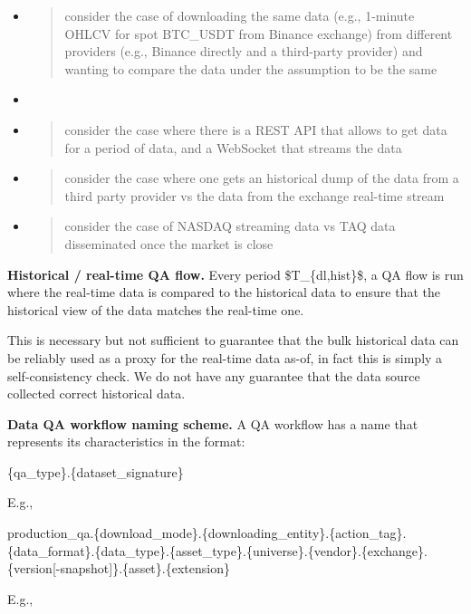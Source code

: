 \documentclass[11pt, reqno]{amsart}
\begin{document}
\begin{itemize}
\item
  \begin{quote}
  consider the case of downloading the same data (e.g., 1-minute OHLCV
  for spot BTC\_USDT from Binance exchange) from different providers
  (e.g., Binance directly and a third-party provider) and wanting to
  compare the data under the assumption to be the same
  \end{quote}
\item
\item
  \begin{quote}
  consider the case where there is a REST API that allows to get data
  for a period of data, and a WebSocket that streams the data
  \end{quote}
\item
  \begin{quote}
  consider the case where one gets an historical dump of the data from a
  third party provider vs the data from the exchange real-time stream
  \end{quote}
\item
  \begin{quote}
  consider the case of NASDAQ streaming data vs TAQ data disseminated
  once the market is close
  \end{quote}
\end{itemize}

\textbf{Historical / real-time QA flow.} Every period
\$T\_\{dl,hist\}\$, a QA flow is run where the real-time data is
compared to the historical data to ensure that the historical view of
the data matches the real-time one.

This is necessary but not sufficient to guarantee that the bulk
historical data can be reliably used as a proxy for the real-time data
as-of, in fact this is simply a self-consistency check. We do not have
any guarantee that the data source collected correct historical data.

\textbf{Data QA workflow naming scheme.} A QA workflow has a name that
represents its characteristics in the format:

\{qa\_type\}.\{dataset\_signature\}

E.g.,

production\_qa.\{download\_mode\}.\{downloading\_entity\}.\{action\_tag\}.\{data\_format\}.\{data\_type\}.\{asset\_type\}.\{universe\}.\{vendor\}.\{exchange\}.\{version{[}-snapshot{]}\}.\{asset\}.\{extension\}

E.g.,
\end{document}
